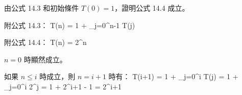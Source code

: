 \startEXERCISE
由公式 14.3 和初始條件 $T(0)=1$，證明公式 14.4 成立。

附公式 14.3：
\startformula
T(n) = 1 + \sum_{j=0}^{n-1} T(j)
\stopformula

附公式 14.4：
\startformula
T(n) = 2^n
\stopformula
\stopEXERCISE

\startANSWER
$n=0$ 時顯然成立。

如果 $n\le i$ 時成立，則 $n=i+1$ 時有：
\startsplitformula\startmathalignment
\NC T(i+1) \NC = 1 + \sum_{j=0}^{i} T(j) \NR
\NC        \NC = 1 + \sum_{j=0}^{i} 2^j \NR
\NC        \NC = 1 + 2^{i+1} - 1 \NR
\NC        \NC = 2^{i+1} \NR
\stopmathalignment\stopsplitformula
\stopANSWER

